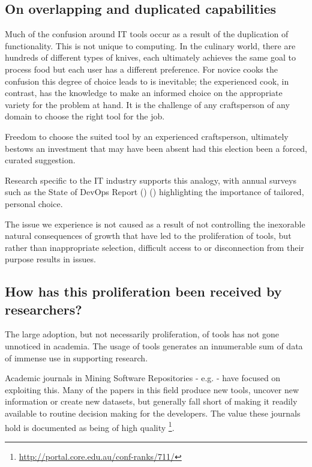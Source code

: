 \subsection{On overlapping and duplicated capabilities}

Much of the confusion around IT tools occur as a result of the duplication of functionality. This is not unique to computing. In the culinary world, there are hundreds of different types of knives, each ultimately achieves the same goal to process food but each user has a different preference. For novice cooks the confusion this degree of choice leads to is inevitable; the experienced cook, in contrast, has the knowledge to make an informed choice on the appropriate variety for the problem at hand. It is the challenge of any craftsperson of any domain to choose the right tool for the job.

Freedom to choose the suited tool by an experienced craftsperson, ultimately bestows an investment that may have been absent had this election been a forced, curated suggestion.

Research specific to the IT industry supports this analogy, with annual surveys such as the State of DevOps Report () ()  highlighting the importance of tailored, personal choice. 

The issue we experience is not caused as a result of not controlling the inexorable natural consequences of growth that have led to the proliferation of tools, but rather than inappropriate selection, difficult access to or disconnection from their purpose results in issues. 

\subsection{How has this proliferation been received by researchers?}

The large adoption, but not necessarily proliferation, of tools has not gone unnoticed in academia. The usage of tools generates an innumerable sum of data of immense use in supporting research.

Academic journals in Mining Software Repositories - e.g. \cite{Storey:2019:3341883} - have focused on exploiting this. Many of the papers in this field produce new tools, uncover new information or create new datasets, but generally fall short of making it readily available to routine decision making for the developers. The value these journals hold is documented as being of high quality \footnote{\url{http://portal.core.edu.au/conf-ranks/711/}}.

